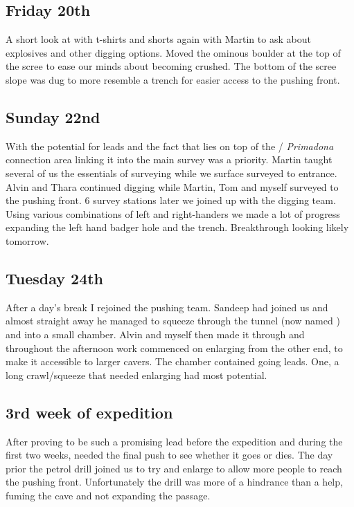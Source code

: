 \subsection{Friday 20th}

A short look at  with t-shirts and shorts again with Martin to ask
about explosives and other digging options. Moved the ominous boulder at
the top of the scree to ease our minds about becoming crushed. The
bottom of the scree slope was dug to more resemble a trench for easier
access to the pushing front.

\subsection{Sunday 22nd}

With the potential for leads and the fact that  lies on top of the
 / \emph{Primadona} connection area linking it into the
main survey was a priority. Martin taught several of us the essentials
of surveying while we surface surveyed to  entrance. Alvin and Thara
continued digging while Martin, Tom and myself surveyed to the pushing
front. 6 survey stations later we joined up with the digging team. Using
various combinations of left and right-handers we made a lot of progress
expanding the left hand badger hole and the trench. Breakthrough looking
likely tomorrow.

\subsection{Tuesday 24th}

After a day's break I rejoined the  pushing team. Sandeep had joined
us and almost straight away he managed to squeeze through the tunnel
(now named ) and into a small chamber. Alvin and myself
then made it through and throughout the afternoon work commenced on
enlarging  from the other end, to make it accessible to
larger cavers. The chamber contained going leads. One, a long
crawl/squeeze that needed enlarging had most potential.

\subsection{3rd week of expedition}

After proving to be such a promising lead before the expedition and
during the first two weeks,  needed the final push to see
whether it goes or dies. The day prior the petrol drill joined us to try
and enlarge  to allow more people to reach the pushing
front. Unfortunately the drill was more of a hindrance than a help,
fuming the cave and not expanding the passage.

